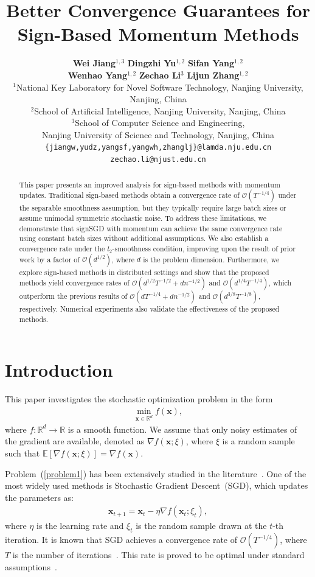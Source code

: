 \documentclass{article}
\title{Better Convergence Guarantees for\\ Sign-Based Momentum Methods}
\author{
\textbf{Wei Jiang}$^{1,3}$ \quad
\textbf{Dingzhi Yu}$^{1,2}$ \quad
\textbf{Sifan Yang}$^{1,2}$ \\
\textbf{Wenhao Yang}$^{1,2}$ \quad
\textbf{Zechao Li}$^{3}$ \quad
\textbf{Lijun Zhang}$^{1,2}$ \\[0.5em]
\normalfont\small
$^{1}$National Key Laboratory for Novel Software Technology, Nanjing University, Nanjing, China \\
$^{2}$School of Artificial Intelligence, Nanjing University, Nanjing, China \\
$^{3}$School of Computer Science and Engineering, \\
Nanjing University of Science and Technology, Nanjing, China \\
\texttt{\{jiangw,yudz,yangsf,yangwh,zhanglj\}@lamda.nju.edu.cn} \\
\texttt{zechao.li@njust.edu.cn}
}
\newcommand{\E}{\mathbb{E}}
\newcommand{\R}{\mathbb{R}}
\def \E {\mathbb{E}}
\def \R {\mathbb{R}}
\def \x {\mathbf{x}}
\def \E {\mathbb{E}}
\def \x {\mathbf{x}}
\def \R {\mathbb{R}}
\begin{document}
\maketitle

\begin{abstract}
This paper presents an improved analysis for sign-based methods with momentum updates. Traditional sign-based methods obtain a convergence rate of $\mathcal{O}(T^{-1/4})$ under the separable smoothness assumption, but they typically require large batch sizes or assume unimodal symmetric stochastic noise. To address these limitations, we demonstrate that signSGD with momentum can achieve the same convergence rate using constant batch sizes without additional assumptions. We also establish a convergence rate under the $l_2$-smoothness condition, improving upon the result of prior work by a factor of $\mathcal{O}(d^{1/2})$, where $d$ is the problem dimension. 
Furthermore, we explore sign-based methods in distributed settings and show that the proposed methods yield convergence rates of $\mathcal{O}\left( d^{1/2}T^{-1/2} + dn^{-1/2} \right)$ and $\mathcal{O}\left(d^{1/4}T^{-1/4}\right)$, which outperform the previous results of $\mathcal{O}\left( dT^{-1/4} + dn^{-1/2} \right)$ and $\mathcal{O}\left( d^{3/8}T^{-1/8} \right)$, respectively. Numerical experiments also validate the effectiveness of the proposed methods.
\end{abstract}


\section{Introduction}
This paper investigates the stochastic optimization problem in the form
\begin{align}\label{problem1}
\min_{\x \in \R^d} f(\x),
\end{align}
where $f: \R^d \to \R$ is a smooth function. We assume that only noisy estimates of the gradient are available, denoted as $\nabla f(\x; \xi)$, where $\xi$ is a random sample such that $\E[\nabla f(\x; \xi)] = \nabla f(\x)$.

Problem~(\ref{problem1}) has been extensively studied in the literature~\citep{JMLR:v12:duchi11a,kingma:adam,loshchilov2017sgdr,Fang2018SPIDERNN,Wang2018SpiderBoostAC}. One of the most widely used methods is Stochastic Gradient Descent~(SGD), which updates the parameters as:
\begin{align}
    \x_{t+1} = \x_t - \eta \nabla f(\x_t;\xi_t),
\end{align}
where $\eta$ is the learning rate and $\xi_t$ is the random sample drawn at the $t$-th iteration. It is known that SGD achieves a convergence rate of $\mathcal{O}(T^{-1/4})$, where $T$ is the number of iterations~\citep{SGD}. This rate is proved to be optimal under standard assumptions~\citep{Arjevani2019LowerBF}.
\end{document}

